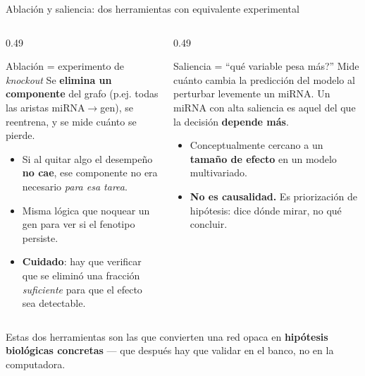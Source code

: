 
\begin{frame}{Ablaci\'on y saliencia: dos herramientas con equivalente experimental}
  \begin{columns}[T]
    \begin{column}{0.49\textwidth}
      \begin{block}{Ablaci\'on = experimento de \emph{knockout}}
        \small
        Se \textbf{elimina un componente} del grafo (p.ej. todas las aristas miRNA$\to$gen), se reentrena, y se mide cu\'anto se pierde.
      \end{block}
      \small
      \begin{itemize}
        \item Si al quitar algo el desempe\~no \textbf{no cae}, ese componente no era necesario \emph{para esa tarea}.
        \item Misma l\'ogica que noquear un gen para ver si el fenotipo persiste.
        \item \textbf{Cuidado}: hay que verificar que se elimin\'o una fracci\'on \emph{suficiente} para que el efecto sea detectable.
      \end{itemize}
    \end{column}
    \begin{column}{0.49\textwidth}
      \begin{block}{Saliencia = ``\textquestiondown{}qu\'e variable pesa m\'as?''}
        \small
        Mide cu\'anto cambia la predicci\'on del modelo al perturbar levemente un miRNA. Un miRNA con alta saliencia es aquel del que la decisi\'on \textbf{depende m\'as}.
      \end{block}
      \small
      \begin{itemize}
        \item Conceptualmente cercano a un \textbf{tama\~no de efecto} en un modelo multivariado.
        \item \textbf{No es causalidad.} Es priorizaci\'on de hip\'otesis: dice d\'onde mirar, no qu\'e concluir.
      \end{itemize}
    \end{column}
  \end{columns}

  \vspace{0.4em}
  \begin{block}{}
    \small
    Estas dos herramientas son las que convierten una red opaca en \textbf{hip\'otesis biol\'ogicas concretas} --- que despu\'es hay que validar en el banco, no en la computadora.
  \end{block}
\end{frame}

